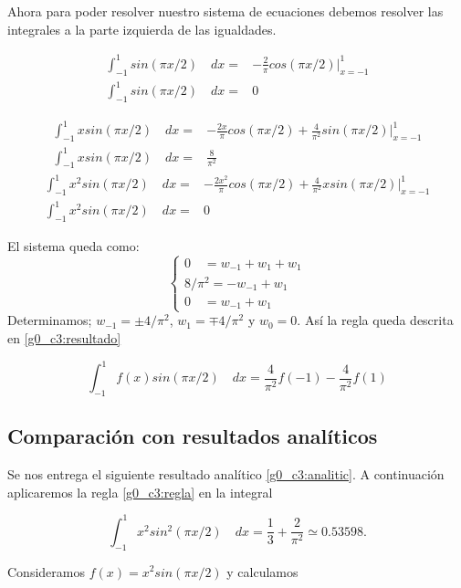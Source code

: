 \documentclass[../portafolio.tex]{subfiles}
\begin{document}
Ahora para poder resolver nuestro sistema de ecuaciones debemos resolver las integrales a la parte izquierda de las igualdades.

\begin{align*}
\int_{-1}^{1}sin(\pi x/2)\quad dx=& -\frac{2}{\pi}cos(\pi x/2)\bigg|_{x=-1}^{1}\\
\int_{-1}^{1}sin(\pi x/2)\quad dx=& 0
\end{align*}

\begin{align*}
\int_{-1}^{1}x sin(\pi x/2) \quad dx =&-\frac{2x}{\pi}cos (\pi x/2)+ \frac{4}{\pi^2}sin(\pi x/2)\bigg|_{x=-1}^{1}\\
\int_{-1}^{1}x sin(\pi x/2) \quad dx =&\frac{8}{\pi^2}
\end{align*}
\begin{align*}
\int_{-1}^{1}x^2 sin(\pi x/2) \quad dx =& -\frac{2x^2}{\pi} cos(\pi x/2) +\frac{4}{\pi^2}x sin(\pi x/2)\bigg|_{x=-1}^{1}\\
\int_{-1}^{1}x^2 sin(\pi x/2) \quad dx =& 0
\end{align*}

El sistema queda como:
\[
\begin{cases}
0 \quad=w_{-1}+w_1  + w_1 \\
8/\pi^2=-w_{-1}+ w_1 \\
0\quad =w_{-1} + w_1 
\end{cases}
\]
Determinamos; $w_{-1}=\pm 4/\pi^2$, $w_{1}=\mp4/\pi^2$ y $w_{0}=0$. Así la regla queda descrita en \eqref{g0_c3:resultado}

\begin{equation}\label{g0_c3:resultado}
\int_{-1}^{1} f(x) sin(\pi x/2) \quad dx =\frac{4}{\pi^2} f(-1) -  \frac{4}{\pi^2} f(1)
\end{equation}

\subsection{Comparación con resultados analíticos}

Se nos entrega el siguiente resultado analítico \eqref{g0_c3:analitic}. A continuación aplicaremos la regla \eqref{g0_c3:regla} en la integral 

\begin{equation}\label{g0_c3:analitic}
\int_{-1}^{1} x^2sin^2(\pi x/2) \quad dx =\frac{1}{3}+ \frac{2}{\pi^2} \simeq 0.53598.
\end{equation}

Consideramos $f(x)=x^2sin(\pi x/2)$ y calculamos 
\end{document}
